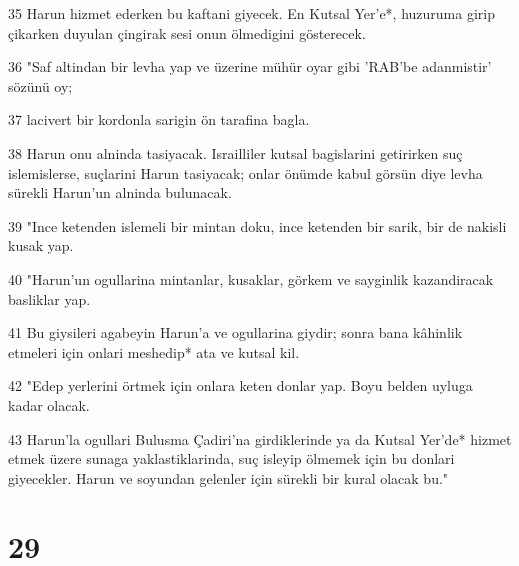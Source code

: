 \par 35 Harun hizmet ederken bu kaftani giyecek. En Kutsal Yer'e*, huzuruma girip çikarken duyulan çingirak sesi onun ölmedigini gösterecek.
\par 36 "Saf altindan bir levha yap ve üzerine mühür oyar gibi 'RAB'be adanmistir' sözünü oy;
\par 37 lacivert bir kordonla sarigin ön tarafina bagla.
\par 38 Harun onu alninda tasiyacak. Israilliler kutsal bagislarini getirirken suç islemislerse, suçlarini Harun tasiyacak; onlar önümde kabul görsün diye levha sürekli Harun'un alninda bulunacak.
\par 39 "Ince ketenden islemeli bir mintan doku, ince ketenden bir sarik, bir de nakisli kusak yap.
\par 40 "Harun'un ogullarina mintanlar, kusaklar, görkem ve sayginlik kazandiracak basliklar yap.
\par 41 Bu giysileri agabeyin Harun'a ve ogullarina giydir; sonra bana kâhinlik etmeleri için onlari meshedip* ata ve kutsal kil.
\par 42 "Edep yerlerini örtmek için onlara keten donlar yap. Boyu belden uyluga kadar olacak.
\par 43 Harun'la ogullari Bulusma Çadiri'na girdiklerinde ya da Kutsal Yer'de* hizmet etmek üzere sunaga yaklastiklarinda, suç isleyip ölmemek için bu donlari giyecekler. Harun ve soyundan gelenler için sürekli bir kural olacak bu."

\chapter{29}

